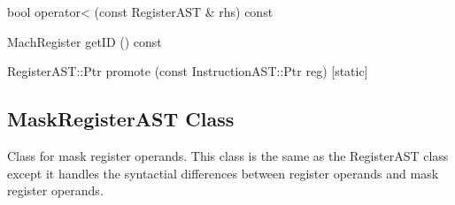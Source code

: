 \begin{apient}
  bool operator< (const RegisterAST & rhs) const
\end{apient}

\begin{apient}
  MachRegister getID () const
\end{apient}

\begin{apient}
  RegisterAST::Ptr promote (const InstructionAST::Ptr reg) [static]
\end{apient}


\subsection{MaskRegisterAST Class}
\label{sec:MaskRegisterAST}

Class for mask register operands. This class is the same as the RegisterAST
class except it handles the syntactial differences between register operands
and mask register operands.
